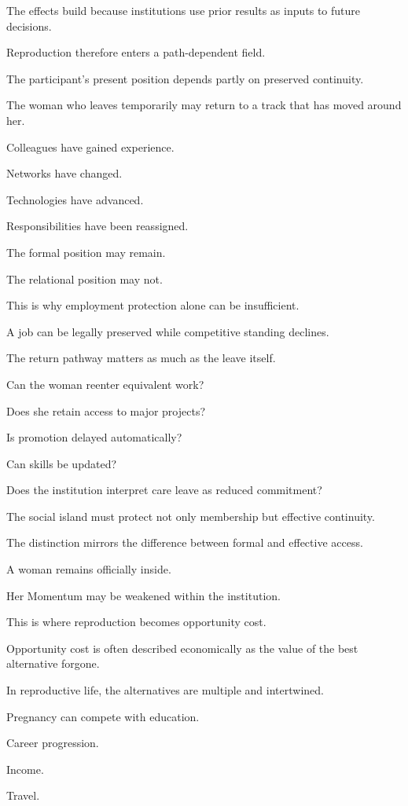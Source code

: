The effects build because institutions use prior results as inputs to future decisions.

Reproduction therefore enters a path-dependent field.

The participant’s present position depends partly on preserved continuity.

The woman who leaves temporarily may return to a track that has moved around her.

Colleagues have gained experience.

Networks have changed.

Technologies have advanced.

Responsibilities have been reassigned.

The formal position may remain.

The relational position may not.

This is why employment protection alone can be insufficient.

A job can be legally preserved while competitive standing declines.

The return pathway matters as much as the leave itself.

Can the woman reenter equivalent work?

Does she retain access to major projects?

Is promotion delayed automatically?

Can skills be updated?

Does the institution interpret care leave as reduced commitment?

The social island must protect not only membership but effective continuity.

The distinction mirrors the difference between formal and effective access.

A woman remains officially inside.

Her Momentum may be weakened within the institution.

This is where reproduction becomes opportunity cost.

Opportunity cost is often described economically as the value of the best alternative forgone.

In reproductive life, the alternatives are multiple and intertwined.

Pregnancy can compete with education.

Career progression.

Income.

Travel.

